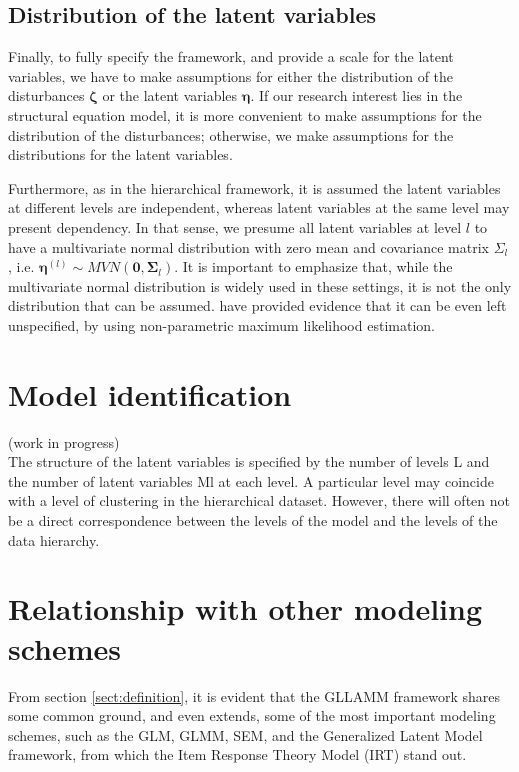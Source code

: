 \subsection{Distribution of the latent variables} \label{s_sect:dist_lv}
Finally, to fully specify the framework, and provide a scale for the latent variables, we have to make assumptions for either the distribution of the disturbances $\pmb{\zeta}$ or the latent variables $\pmb{\eta}$. If our research interest lies in the structural equation model, it is more convenient to make assumptions for the distribution of the disturbances; otherwise, we make assumptions for the distributions for the latent variables. 

Furthermore, as in the hierarchical framework, it is assumed the latent variables at different levels are independent, whereas latent variables at the same level may present dependency. In that sense, we presume all latent variables at level $l$ to have a multivariate normal distribution with zero mean and covariance matrix $\Sigma_{l}$, i.e. $\pmb{\eta}^{(l)} \sim MVN(\mathbf{0}, \pmb{\Sigma}_{l})$. It is important to emphasize that, while the multivariate normal distribution is widely used in these settings, it is not the only distribution that can be assumed. \citet{Rabe_et_al_2003a} have provided evidence that it can be even left unspecified, by using non-parametric maximum likelihood estimation.



\section{Model identification} \label{sect:identification}
{\color{red}(work in progress) \\
	
The structure of the latent variables is specified by the number of levels L and the number of latent variables Ml at each level. A particular level may coincide with a level of clustering in the hierarchical dataset. However, there will often not be a direct correspondence between the levels of the model and the levels of the data hierarchy.

}


\section{Relationship with other modeling schemes}

From section \ref{sect:definition}, it is evident that the GLLAMM framework shares some common ground, and even extends, some of the most important modeling schemes, such as the GLM, GLMM, SEM, and the Generalized Latent Model framework, from which the Item Response Theory Model (IRT) stand out.

